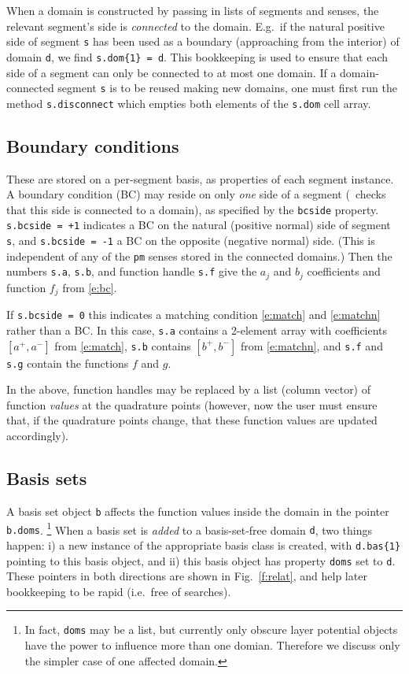 \documentclass[12pt]{article}
\begin{document}
When a domain is constructed by passing in lists of segments
and senses, the relevant segment's side is {\em connected} to the domain.
E.g.\ if the natural positive side of segment {\tt s} has been used
as a boundary (approaching from the interior) of domain {\tt d},
we find \verb?s.dom{1} = d?.
This bookkeeping is used to ensure that each side of a segment
can only be connected to at most one domain.
If a domain-connected segment {\tt s} is to be reused making new domains,
one must first run the method {\tt s.disconnect}
which empties both elements of the {\tt s.dom} cell array.


\subsection{Boundary conditions}

These are stored on a per-segment basis, as properties of each segment
instance. A boundary condition (BC) may reside on only {\em one} side of a
segment (\mpspack\ checks that this side is connected to a domain),
as specified by the {\tt bcside} property.
{\tt s.bcside = +1} indicates a BC on the natural (positive
normal) side of segment {\tt s}, and {\tt s.bcside = -1} a BC on the
opposite (negative normal) side.
(This is independent of any of the {\tt pm} senses stored in the connected
domains.)
Then the numbers {\tt s.a}, {\tt s.b},
and function handle {\tt s.f} give the
$a_j$ and $b_j$ coefficients and function $f_j$ from \eqref{e:bc}.

If {\tt s.bcside = 0} this indicates a matching condition
\eqref{e:match} and \eqref{e:matchn} rather than a BC. In this case,
{\tt s.a} contains a 2-element array with coefficients
$[a^+, a^-]$ from \eqref{e:match}, {\tt s.b} contains
$[b^+, b^-]$ from \eqref{e:matchn},
and {\tt s.f} and {\tt s.g} contain the functions $f$ and $g$.

In the above, function handles may be replaced by a list (column vector)
of function {\em values}
at the quadrature points (however, now the user must ensure that, if
the quadrature points change, that these function values are updated
accordingly).


\subsection{Basis sets}

A basis set object {\tt b} affects the
function values inside the domain in the pointer {\tt b.doms}.%
  \footnote{In fact, {\tt doms} may be a list, but currently only obscure
    layer potential objects have the power to influence more than
    one domian. Therefore we discuss only the simpler
    case of one affected domain.}
When a basis set is {\em added} to a basis-set-free domain {\tt d},
two things happen: i) a new instance of the appropriate basis class
is created, with \verb?d.bas{1}? pointing to this basis object,
and ii) this basis object has property {\tt doms} set to {\tt d}.
These pointers in both directions are shown in Fig.~\ref{f:relat},
and help later bookkeeping to be rapid (i.e.\ free of searches).
\end{document}
